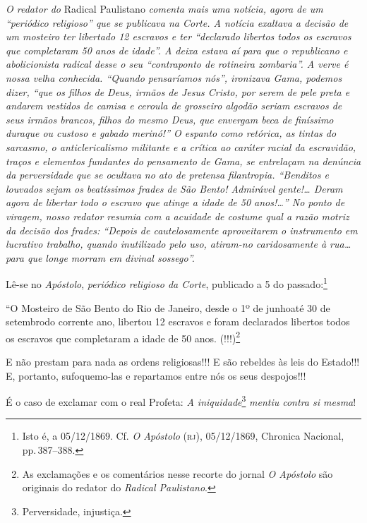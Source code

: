 \begin{didascalia}
\emph{O redator do} Radical Paulistano \emph{comenta mais uma notícia,
agora de um ``periódico religioso'' que se publicava na Corte. A notícia
exaltava a decisão de um mosteiro ter libertado 12 escravos e ter
``declarado libertos todos os escravos que completaram 50 anos de idade''.
A deixa estava aí para que o republicano e abolicionista radical desse o
seu ``contraponto de rotineira zombaria''. A verve é nossa velha
conhecida. ``Quando pensaríamos nós'', ironizava Gama, podemos dizer, ``que
os filhos de Deus, irmãos de Jesus Cristo, por serem de pele preta e
andarem vestidos de camisa e ceroula de grosseiro algodão seriam
escravos de seus irmãos brancos, filhos do mesmo Deus, que envergam beca
de finíssimo duraque ou custoso e gabado merinó!'' O espanto como
retórica, as tintas do sarcasmo, o anticlericalismo militante e a
crítica ao caráter racial da escravidão, traços e elementos fundantes do
pensamento de Gama, se entrelaçam na denúncia da perversidade que se
ocultava no ato de pretensa filantropia. ``Benditos e louvados sejam os
beatíssimos frades de São Bento! Admirável gente!\ldots{} Deram agora de
libertar todo o escravo que atinge a idade de 50 anos!\ldots{}'' No ponto de
viragem, nosso redator resumia com a acuidade de costume qual a razão
motriz da decisão dos frades: ``Depois de cautelosamente aproveitarem o
instrumento em lucrativo trabalho, quando inutilizado pelo uso,
atiram-no caridosamente à rua\ldots{} para que longe morram em divinal
sossego''.}
\end{didascalia}


Lê-se no \emph{Apóstolo}, \emph{periódico religioso da Corte}, publicado
a 5 do passado:\footnote{ Isto é, a 05/12/1869. Cf. \emph{O Apóstolo}
  (\textsc{rj}), 05/12/1869, Chronica Nacional, pp.\,387--388.}

``O Mosteiro de São Bento do Rio de Janeiro, desde o 1º de junhoaté 30 de
setembrodo corrente ano, libertou 12 escravos e foram declarados
libertos todos os escravos que completaram a idade de 50 anos.
(!!!)\footnote{ As exclamações e os comentários nesse recorte do jornal
  \emph{O Apóstolo} são originais do redator do \emph{Radical
  Paulistano}.}

E não prestam para nada as ordens religiosas!!! E são rebeldes às leis
do Estado!!! E, portanto, sufoquemo-las e repartamos entre nós os seus
despojos!!!

É o caso de exclamar com o real Profeta: \emph{A iniquidade}\footnote{
  Perversidade, injustiça.} \emph{mentiu contra si mesma}!


